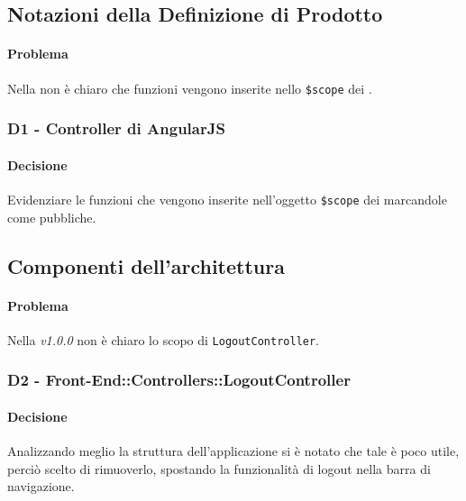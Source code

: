 \subsection{Notazioni della Definizione di Prodotto}
\paragraph{Problema}\label{pNotazioneController}
Nella \DP non è chiaro che funzioni vengono inserite nello \texttt{\$scope} dei .
\subsubsection{\textbf{D1} - Controller di AngularJS}\label{dNotazioneController}
\paragraph{Decisione}
Evidenziare le funzioni che vengono inserite nell'oggetto \texttt{\$scope} dei  marcandole come pubbliche.
\subsection{Componenti dell'architettura}
\paragraph{Problema}\label{pLogoutController}
Nella \DP \emph{v1.0.0} non è chiaro lo scopo di \texttt{LogoutController}.
\subsubsection{\textbf{D2} - Front-End::Controllers::LogoutController}\label{dLogoutController}
\paragraph{Decisione}
Analizzando meglio la struttura dell'applicazione si è notato che tale  è poco utile, perciò scelto di rimuoverlo, spostando la funzionalità di logout nella barra di navigazione.
